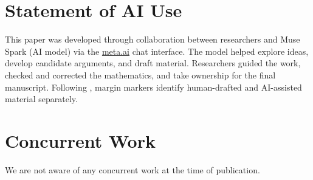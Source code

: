 \documentclass[11pt]{article}
\theoremstyle{plain}
\theoremstyle{definition}
\begin{document}
\section*{Statement of AI Use}

\begin{humanblock}
This paper was developed through collaboration between researchers and Muse Spark (AI model) via the \href{http://meta.ai}{meta.ai} chat interface. The model helped explore ideas, develop candidate arguments, and draft material. Researchers guided the work, checked and corrected the mathematics, and take ownership for the final manuscript. Following \cite{schmitt2025extremal}, margin markers identify human-drafted \!\!\HumanLabel and AI-assisted material \!\!\AILabel separately.
\end{humanblock}

\section*{Concurrent Work}
\begin{humanblock}
We are not aware of any concurrent work at the time of publication.
\end{humanblock}
\end{document}
